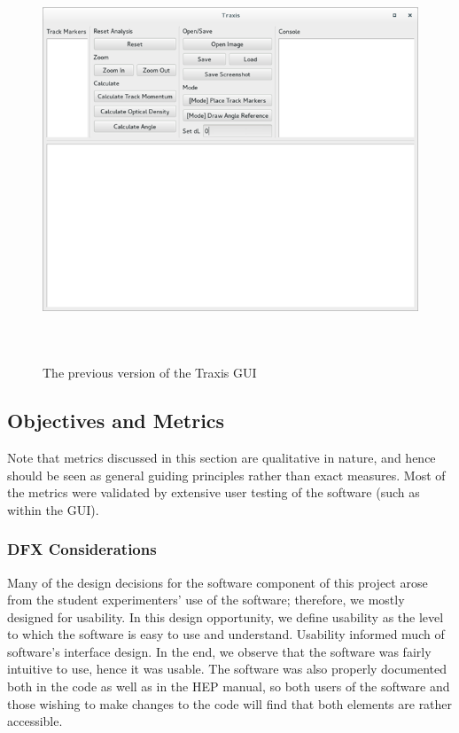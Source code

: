 \documentclass[12pt]{article} %
\begin{document}
\begin{figure}[htb]
    \centering
    \includegraphics[width = \linewidth, height = 12cm]{old_traxis.png}
    \caption{The previous version of the Traxis GUI}
    \label{fig:old_traxis}
\end{figure}

\subsection{Objectives and Metrics}
Note that metrics discussed in this section are qualitative in nature, and hence should be seen as general guiding principles rather than exact measures. Most of the metrics were validated by extensive user testing of the software (such as within the GUI).

\subsubsection{DFX Considerations} \label{dfx software}
Many of the design decisions for the software component of this project arose from the student experimenters' use of the software; therefore, we mostly designed for usability. In this design opportunity, we define usability as the level to which the software is easy to use and understand. Usability informed much of software's interface design. In the end, we observe that the software was fairly intuitive to use, hence it was usable. The software was also properly documented both in the code as well as in the HEP manual, so both users of the software and those wishing to make changes to the code will find that both elements are rather accessible.
\end{document}

